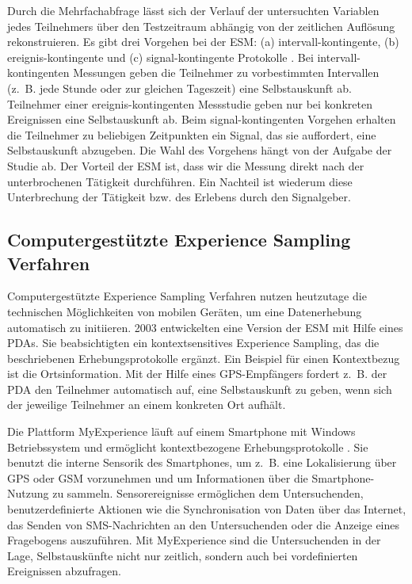 Durch die Mehrfachabfrage lässt sich der Verlauf der untersuchten Variablen jedes Teilnehmers über den Testzeitraum abhängig von der zeitlichen Auflösung rekonstruieren. Es gibt drei Vorgehen bei der \ac{ESM}: (a) intervall-kontingente, (b) ereignis-kontingente und (c) signal-kontingente Protokolle \citep[][S.~198ff.]{Reis2000}. Bei intervall-kontingenten Messungen geben die Teilnehmer zu vorbestimmten Intervallen (z.~B. jede Stunde oder zur gleichen Tageszeit) eine Selbstauskunft ab. Teilnehmer einer ereignis-kontingenten Messstudie geben nur bei konkreten Ereignissen eine Selbstauskunft ab. Beim signal-kontingenten Vorgehen erhalten die Teilnehmer zu beliebigen Zeitpunkten ein Signal, das sie auffordert, eine Selbstauskunft abzugeben. Die Wahl des Vorgehens hängt von der Aufgabe der Studie ab. Der Vorteil der \ac{ESM} ist, dass wir die Messung direkt nach der unterbrochenen Tätigkeit durchführen. Ein Nachteil ist wiederum diese Unterbrechung der Tätigkeit bzw. des Erlebens durch den Signalgeber.


\subsection{Computergestützte Experience Sampling Verfahren} %
\label{sub:computergestutzte_experience_sampling_verfahren}

Computergestützte Experience Sampling Verfahren nutzen heutzutage die technischen Möglichkeiten von mobilen Geräten, um eine Datenerhebung automatisch zu initiieren. 2003 entwickelten \citet{Intille2003} eine Version der \ac{ESM} mit Hilfe eines \ac{PDA}s. Sie beabsichtigten ein kontextsensitives Experience Sampling, das die beschriebenen Erhebungsprotokolle ergänzt. Ein Beispiel für einen Kontextbezug ist die Ortsinformation. Mit der Hilfe eines \ac{GPS}-Empfängers fordert z.~B. der \ac{PDA} den Teilnehmer automatisch auf, eine Selbstauskunft zu geben, wenn sich der jeweilige Teilnehmer an einem konkreten Ort aufhält.

Die Plattform MyExperience läuft auf einem Smartphone mit Windows Betriebssystem und ermöglicht kontextbezogene Erhebungsprotokolle \citep[][]{Froehlich2007}. Sie benutzt die interne Sensorik des Smartphones, um z.~B. eine Lokalisierung über \ac{GPS} oder \acs{GSM} vorzunehmen und um Informationen über die Smartphone-Nutzung zu sammeln. Sensorereignisse ermöglichen dem Untersuchenden, benutzerdefinierte Aktionen wie die Synchronisation von Daten über das Internet, das Senden von \acs{SMS}-Nachrichten an den Untersuchenden oder die Anzeige eines Fragebogens auszuführen. Mit MyExperience sind die Untersuchenden in der Lage, Selbstauskünfte nicht nur zeitlich, sondern auch bei vordefinierten Ereignissen abzufragen.

